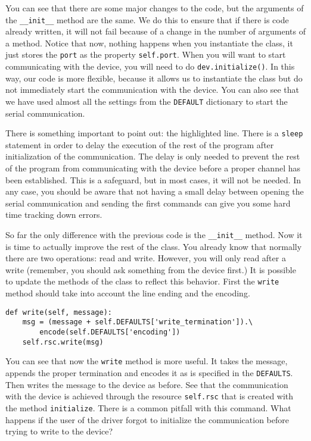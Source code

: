 You can see that there are some major changes to the code, but the
arguments of the \texttt{\_\_init\_\_} method are the same. We do this
to ensure that if there is code already written, it will not fail
because of a change in the number of arguments of a method. Notice that
now, nothing happens when you instantiate the class, it just stores the
\texttt{port} as the property \texttt{self.port}. When you will want to
start communicating with the device, you will need to do
\texttt{dev.initialize()}. In this way, our code is more flexible,
because it allows us to instantiate the class but do not immediately
start the communication with the device. You can also see that we have
used almost all the settings from the \texttt{DEFAULT} dictionary to
start the serial communication.

There is something important to point out: the highlighted line. There
is a \texttt{sleep} statement in order to delay the execution of the
rest of the program after initialization of the communication. The delay
is only needed to prevent the rest of the program from communicating
with the device before a proper channel has been established. This is a
safeguard, but in most cases, it will not be needed. In any case, you
should be aware that not having a small delay between opening the serial
communication and sending the first commands can give you some hard time
tracking down errors.

So far the only difference with the previous code is the
\texttt{\_\_init\_\_} method. Now it is time to actually improve the
rest of the class. You already know that normally there are two
operations: read and write. However, you will only read after a write
(remember, you should ask something from the device first.) It is
possible to update the methods of the class to reflect this behavior.
First the \texttt{write} method should take into account the line ending
and the encoding.

\begin{verbatim}
def write(self, message):
    msg = (message + self.DEFAULTS['write_termination']).\
        encode(self.DEFAULTS['encoding'])
    self.rsc.write(msg)
\end{verbatim}

You can see that now the \texttt{write} method is more useful. It takes
the message, appends the proper termination and encodes it as is
specified in the \texttt{DEFAULTS}. Then writes the message to the
device as before. See that the communication with the device is achieved
through the resource \texttt{self.rsc} that is created with the method
\texttt{initialize}. There is a common pitfall with this command. What
happens if the user of the driver forgot to initialize the communication
before trying to write to the device?


